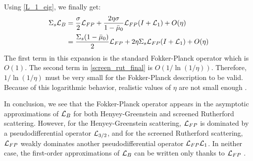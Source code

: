 Using \cref{L_1_eig}, we finally get:
\begin{equation}
\begin{split}
\Sigma_s \mc{L}_B &= \frac{\sigma}{2}\mc{L}_{FP} + \frac{2\eta
\sigma}{1-\bar{\mu}_0} \mc{L}_{FP}(I+\mc{L}_1) + O(\eta)\\
&= \frac{\Sigma_s(1-\bar{\mu}_0)}{2} \mc{L}_{FP} + 2 \eta \Sigma_s \mc{L}_{FP}
(I+\mc{L}_1) + O(\eta)
\label{screen_rut_final}
\end{split}
\end{equation}
The first term in this expansion is the standard Fokker-Planck operator which
is $O(1)$. The second term in \cref{screen_rut_final} is $O(1/\ln(1/\eta))$. 
Therefore, $1/\ln(1/\eta)$ must be very small for the Fokker-Planck description 
to be valid. Because of this logarithmic behavior, realistic values of $\eta$
are not small enough \cite{pencil_pomraning}.

In conclusion, we see that the Fokker-Planck operator appears in the asymptotic 
approximations of $\mathcal{L}_B$ for both Henyey-Greenstein and screened Rutherford 
scattering. However, for the Henyey-Greenstein scattering, $\mathcal{L}_{FP}$ is 
dominated by a pseudodifferential operator $\mathcal{L}_{3/2}$, and for the screened 
Rutherford scattering, $\mathcal{L}_{FP}$ weakly dominates another pseudodifferential 
operator $\mathcal{L}_{FP}\mathcal{L}_1$. In neither case, the first-order approximations of 
$\mathcal{L}_B$ can be written only thanks to $\mathcal{L}_{FP}$ \cite{larsen_fp}.
